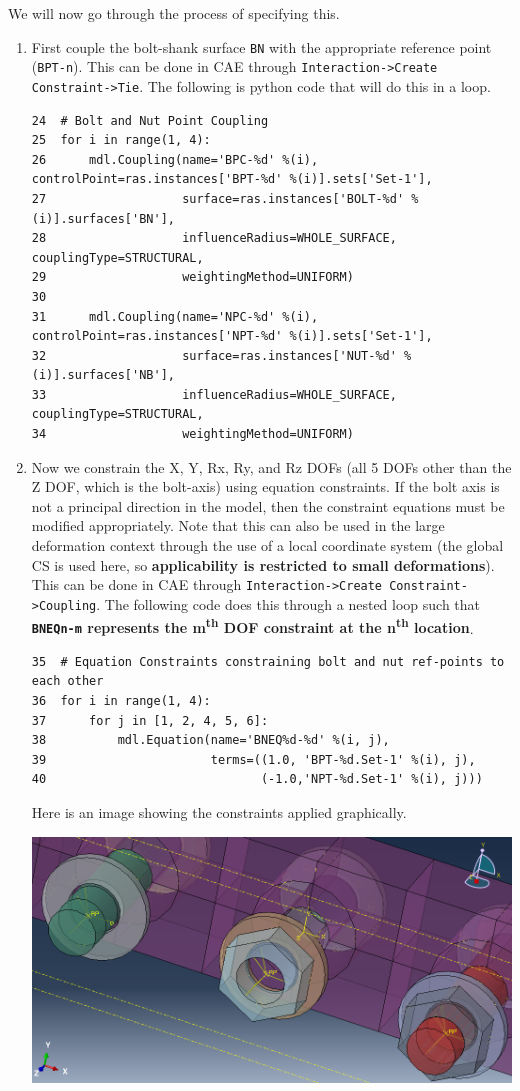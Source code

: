\documentclass[11pt]{article}
\begin{document}
We will now go through the process of specifying this.
\begin{enumerate}
\item First couple the bolt-shank surface \texttt{BN} with the appropriate reference point (\texttt{BPT-n}).
This can be done in CAE through \texttt{Interaction->Create Constraint->Tie}.
The following is python code that will do this in a loop.
\begin{verbatim}
24  # Bolt and Nut Point Coupling
25  for i in range(1, 4):
26      mdl.Coupling(name='BPC-%d' %(i), controlPoint=ras.instances['BPT-%d' %(i)].sets['Set-1'],
27                   surface=ras.instances['BOLT-%d' %(i)].surfaces['BN'],
28                   influenceRadius=WHOLE_SURFACE, couplingType=STRUCTURAL,
29                   weightingMethod=UNIFORM)
30  
31      mdl.Coupling(name='NPC-%d' %(i), controlPoint=ras.instances['NPT-%d' %(i)].sets['Set-1'],
32                   surface=ras.instances['NUT-%d' %(i)].surfaces['NB'],
33                   influenceRadius=WHOLE_SURFACE, couplingType=STRUCTURAL,
34                   weightingMethod=UNIFORM)
\end{verbatim}
\item Now we constrain the X, Y, Rx, Ry, and Rz DOFs (all 5 DOFs other than the Z DOF, which is the bolt-axis) using equation constraints.
If the bolt axis is not a principal direction in the model, then the constraint equations must be modified appropriately.
Note that this can also be used in the large deformation context through the use of a local coordinate system (the global CS is used here, so \textbf{applicability is restricted to small deformations}).
This can be done in CAE through \texttt{Interaction->Create Constraint->Coupling}.
The following code does this through a nested loop such that \textbf{\texttt{BNEQn-m}  represents the m\textsuperscript{th} DOF constraint at the n\textsuperscript{th} location}.
\begin{verbatim}
35  # Equation Constraints constraining bolt and nut ref-points to each other
36  for i in range(1, 4):
37      for j in [1, 2, 4, 5, 6]:
38          mdl.Equation(name='BNEQ%d-%d' %(i, j),
39                       terms=((1.0, 'BPT-%d.Set-1' %(i), j),
40                              (-1.0,'NPT-%d.Set-1' %(i), j)))
\end{verbatim}
Here is an image showing the constraints applied graphically.
\begin{center}
\includegraphics[width=.9\linewidth]{./figs/conss.png}

\end{center}
\end{enumerate}
\end{document}
